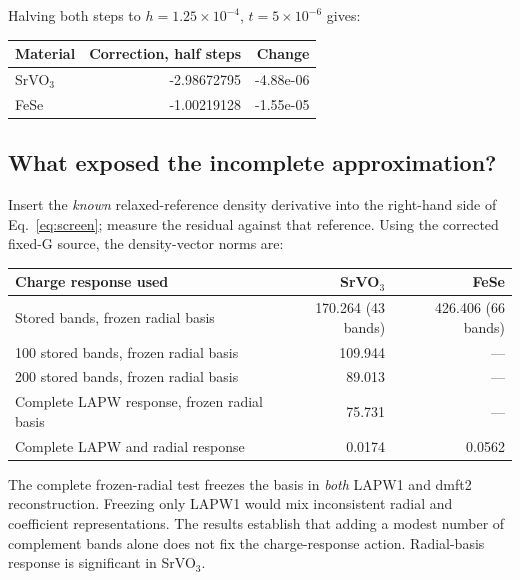 \documentclass[11pt]{article}
\begin{document}
Halving both steps to $h=1.25\times10^{-4}$, $t=5\times10^{-6}$ gives:
\begin{center}\small
\begin{tabular}{lrr}\toprule
Material & Correction, half steps & Change\\\midrule
SrVO$_3$ & -2.98672795 & -4.88e-06 \\
FeSe & -1.00219128 & -1.55e-05 \\
\bottomrule\end{tabular}\end{center}

\subsection*{What exposed the incomplete approximation?}
Insert the \emph{known} relaxed-reference density derivative into the
right-hand side of Eq.~\eqref{eq:screen}; measure the residual against that
reference. Using the corrected fixed-G source, the density-vector norms are:
\begin{center}\small
\begin{tabular}{lrr}\toprule
Charge response used & SrVO$_3$ & FeSe\\\midrule
Stored bands, frozen radial basis & 170.264 (43 bands) & 426.406 (66 bands)\\
100 stored bands, frozen radial basis & 109.944 & ---\\
200 stored bands, frozen radial basis & 89.013 & ---\\
Complete LAPW response, frozen radial basis & 75.731 & ---\\
Complete LAPW and radial response & 0.0174 & 0.0562\\\bottomrule
\end{tabular}\end{center}
The complete frozen-radial test freezes the basis in \emph{both} LAPW1 and
dmft2 reconstruction. Freezing only LAPW1 would mix inconsistent radial and
coefficient representations. The results establish that adding a modest
number of complement bands alone does not fix the charge-response action.
Radial-basis response is significant in SrVO$_3$.
\end{document}
